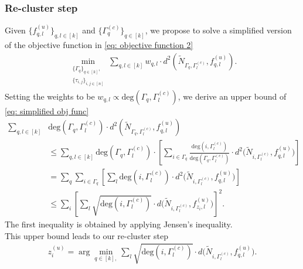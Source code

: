\subsubsection{Re-cluster step}
Given $\{f_{q,l}^{(u)}\}_{q,l\in[k]}$ and $\{\Gamma_q^{(c)}\}_{q\in[k]}$, we propose to solve a simplified version of the objective function in \eqref{eq: objective function 2}
\begin{align}
	\min_{\substack{\{\Gamma_q\}_{q\in[k]},\\  \{\tau_{i,j}\}_{i,j\in[n]}}} 
	\sum_{q,l\in[k]}
	w_{q,l}\cdot
	 d^2(\tilde N_{\Gamma_q, \Gamma_l^{(c)}}, f_{q,l}^{(u)}).
	 \label{eq: simplified obj func}
\end{align}
Setting the weights to be $w_{q,l}\propto \text{deg}(\Gamma_q,\Gamma_l^{(c)}) $, we derive an upper bound of \eqref{eq: simplified obj func} 
\begin{align*}
	\sum_{q,l\in[k]}
	&\text{deg}(\Gamma_q,\Gamma_l^{(c)})
	\cdot
	 d^2(\tilde N_{\Gamma_q, \Gamma_l^{(c)}}, f_{q,l}^{(u)})
	 \\
	&\leq
	\sum_{q,l\in[k]}
	\text{deg}(\Gamma_q,\Gamma_l^{(c)})
	\cdot
	\left[ \sum_{i\in\Gamma_q}\frac{\text{deg}(i,\Gamma_l^{(c)})}{\text{deg}(\Gamma_q,\Gamma_l^{(c)})} \cdot
	 d^2 \Big( \tilde N_{i, \Gamma_l^{(c)}}, f_{q,l}^{(u)} \Big)  \right] 
	 \\
	 &= \sum_{q}\sum_{i\in\Gamma_q} 
	 \left[ \sum_{l} \text{deg}(i, \Gamma_l^{(c)}) \cdot d^2 \Big( \tilde N_{i, \Gamma_l^{(c)}}, f_{q,l}^{(u)} \Big) \right] 
	 \\
	 &\leq \sum_i \left[ \sum_{l} \sqrt{\text{deg}(i, \Gamma_l^{(c)})} \cdot d \Big( \tilde N_{i, \Gamma_l^{(c)}}, f_{z_i,l}^{(u)} \Big) \right]^2.
\end{align*}
The first inequality is obtained by applying Jensen's inequality.
\\
This upper bound leads to our re-cluster step
\begin{align}
z_i^{(u)} 
=
\arg\min_{q\in[k], } \sum_{l} \sqrt{\text{deg}(i, \Gamma_l^{(c)})} \cdot d \Big( \tilde N_{i, \Gamma_l^{(c)}}, f_{q,l}^{(u)} \Big).
\label{eq: update clusters}
\end{align}


